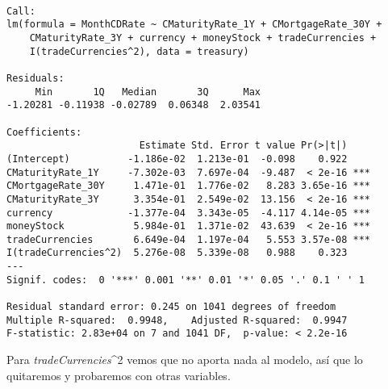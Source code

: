\documentclass[11pt]{article}
\begin{document}
    
    \begin{verbatim}

Call:
lm(formula = MonthCDRate ~ CMaturityRate_1Y + CMortgageRate_30Y + 
    CMaturityRate_3Y + currency + moneyStock + tradeCurrencies + 
    I(tradeCurrencies^2), data = treasury)

Residuals:
     Min       1Q   Median       3Q      Max 
-1.20281 -0.11938 -0.02789  0.06348  2.03541 

Coefficients:
                       Estimate Std. Error t value Pr(>|t|)    
(Intercept)          -1.186e-02  1.213e-01  -0.098    0.922    
CMaturityRate_1Y     -7.302e-03  7.697e-04  -9.487  < 2e-16 ***
CMortgageRate_30Y     1.471e-01  1.776e-02   8.283 3.65e-16 ***
CMaturityRate_3Y      3.354e-01  2.549e-02  13.156  < 2e-16 ***
currency             -1.377e-04  3.343e-05  -4.117 4.14e-05 ***
moneyStock            5.984e-01  1.371e-02  43.639  < 2e-16 ***
tradeCurrencies       6.649e-04  1.197e-04   5.553 3.57e-08 ***
I(tradeCurrencies^2)  5.276e-08  5.339e-08   0.988    0.323    
---
Signif. codes:  0 '***' 0.001 '**' 0.01 '*' 0.05 '.' 0.1 ' ' 1

Residual standard error: 0.245 on 1041 degrees of freedom
Multiple R-squared:  0.9948,	Adjusted R-squared:  0.9947 
F-statistic: 2.83e+04 on 7 and 1041 DF,  p-value: < 2.2e-16

    \end{verbatim}

    
    Para \emph{tradeCurrencies}\^{}2 vemos que no aporta nada al modelo, así
que lo quitaremos y probaremos con otras variables.
\end{document}
